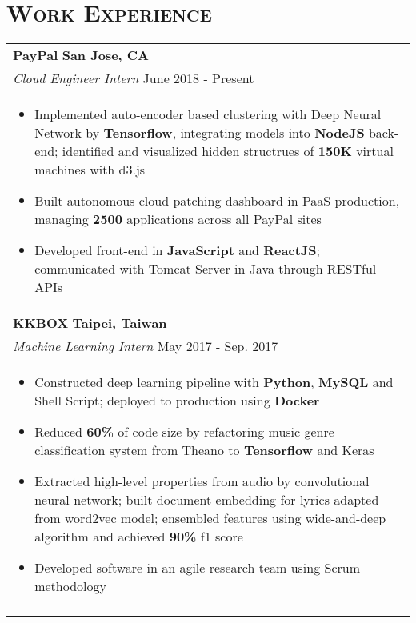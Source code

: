 \documentclass[letterpaper,11pt]{article} %
\begin{document}
{%
\section{\Large\bf\textsc{Work Experience}}
\begin{tabular}{p{18.5cm}}

{\bf{PayPal}} \hfill \bf{San Jose, CA}\\
{\it Cloud Engineer Intern} \hfill June 2018 - Present\\%
\begin{itemize}
\vspace{-3mm}
\item Implemented auto-encoder based clustering with Deep Neural Network by {\bf Tensorflow}, integrating models into {\bf NodeJS} back-end; identified and visualized hidden structrues of {\bf 150K} virtual machines with d3.js 
\item Built autonomous cloud patching dashboard in PaaS production, managing {\bf 2500} applications across all PayPal sites 
\item Developed front-end in {\bf JavaScript} and {\bf ReactJS}; communicated with Tomcat Server in Java through RESTful APIs
\vspace*{-\baselineskip} 
\end{itemize} \\ 
\vspace{.1mm}

{\bf{KKBOX}} \hfill \bf{Taipei, Taiwan}\\
{\it Machine Learning Intern} \hfill  May 2017 - Sep. 2017\\%
\begin{itemize}
\vspace{-3mm}
\item Constructed deep learning pipeline with {\bf Python}, {\bf MySQL} and Shell Script; deployed to production using {\bf Docker}
\item Reduced {\bf 60\%} of code size by refactoring music genre classification system from Theano to {\bf Tensorflow} and Keras 
\item Extracted high-level properties from audio by convolutional neural network; built document embedding for lyrics adapted from word2vec model; ensembled features using wide-and-deep algorithm and achieved {\bf 90\%} f1 score 
\item Developed software in an agile research team using Scrum methodology \vspace*{-\baselineskip}
\end{itemize} \\ 
\vspace{.1mm}


\end{tabular}}
\end{document}
